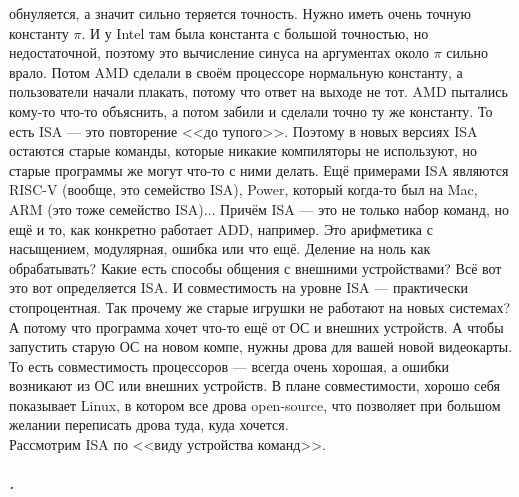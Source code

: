 \documentclass{article}
\begin{document}
обнуляется, а значит сильно теряется точность. Нужно иметь очень точную константу $\pi$. И у Intel там была константа с большой точностью, но недостаточной, поэтому это вычисление синуса на аргументах около $\pi$ сильно врало. Потом AMD сделали в своём процессоре нормальную константу, а пользователи начали плакать, потому что ответ на выходе не тот. AMD пытались кому-то что-то объяснить, а потом забили и сделали точно ту же константу. То есть ISA --- это повторение <<до тупого>>. Поэтому в новых версиях ISA остаются старые команды, которые никакие компиляторы не используют, но старые программы же могут что-то с ними делать. Ещё примерами ISA являются RISC-V (вообще, это семейство ISA), Power, который когда-то был на Mac, ARM (это тоже семейство ISA)... Причём ISA --- это не только набор команд, но ещё и то, как конкретно работает ADD, например. Это арифметика с насыщением, модулярная, ошибка или что ещё. Деление на ноль как обрабатывать? Какие есть способы общения с внешними устройствами? Всё вот это вот определяется ISA. И совместимость на уровне ISA --- практически стопроцентная. Так прочему же старые игрушки не работают на новых системах? А потому что программа хочет что-то ещё от ОС и внешних устройств. А чтобы запустить старую ОС на новом компе, нужны дрова для вашей новой видеокарты. То есть совместимость процессоров --- всегда очень хорошая, а ошибки возникают из ОС или внешних устройств. В плане совместимости, хорошо себя показывает Linux, в котором все дрова open-source, что позволяет при большом желании переписать дрова туда, куда хочется.\\
    Рассмотрим ISA по <<виду устройства команд>>.
    \subparagraph{.}
    \begin{center}
    \end{center}
\end{document}
